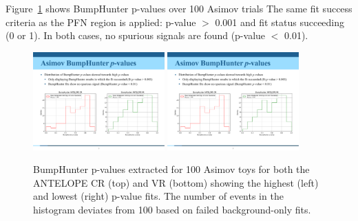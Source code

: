 Figure~\ref{fig:bh_asimov_pvals} shows BumpHunter p-values over 100 Asimov trials
The same fit success criteria as the PFN region is applied: p-value  $>$ 0.001 and fit status succeeding (0 or 1).
In both cases, no spurious signals are found (p-value $<$ 0.01).
\begin{figure}[!htbp]
\centering
   \includegraphics[width=0.45\textwidth]{figures/stats/bh_asimov_pvals_cr}
   \includegraphics[width=0.45\textwidth]{figures/stats/bh_asimov_pvals_vr}
    \caption{BumpHunter p-values extracted for 100 Asimov toys for both the ANTELOPE CR (top) and VR (bottom) showing the highest (left) and lowest (right) p-value fits. The number of events in the histogram deviates from 100 based on failed background-only fits.
    \label{fig:bh_asimov_pvals}}
\end{figure}




